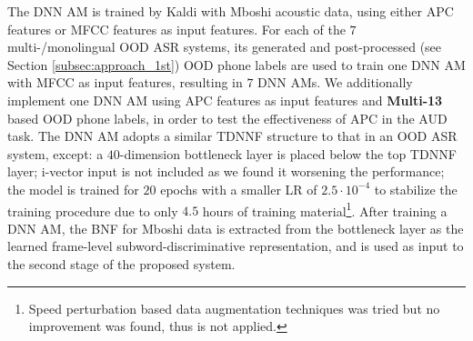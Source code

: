 \documentclass[a4paper]{article}
\begin{document}
The DNN AM is trained by Kaldi with Mboshi acoustic data, using either APC features or MFCC features as input features. 
For each of  the $7$ multi-/monolingual OOD ASR systems, its generated and post-processed (see Section \ref{subsec:approach_1st}) OOD phone labels are used    to train one DNN AM with MFCC as input features, resulting in $7$ DNN AMs. We additionally implement one DNN AM using APC features as input features and \textbf{Multi-13} based OOD phone labels, in order to test the effectiveness of APC in the AUD task.
The DNN AM adopts a similar TDNNF structure to that in an OOD ASR system, except: a $40$-dimension bottleneck layer is  placed below the top TDNNF layer; i-vector input is not included as we found  it worsening the performance; the model is trained for $20$ epochs with a smaller LR of $2.5\cdot 10^{-4}$ to stabilize the training procedure due to only $4.5$ hours of training material\footnote{Speed perturbation based data augmentation techniques was tried but no improvement was found, thus is not applied.}.  After training a  DNN AM, the BNF for Mboshi data is extracted from the bottleneck layer  as the  learned frame-level subword-discriminative representation, and is used as input to the 
second stage of the proposed system.

\end{document}
